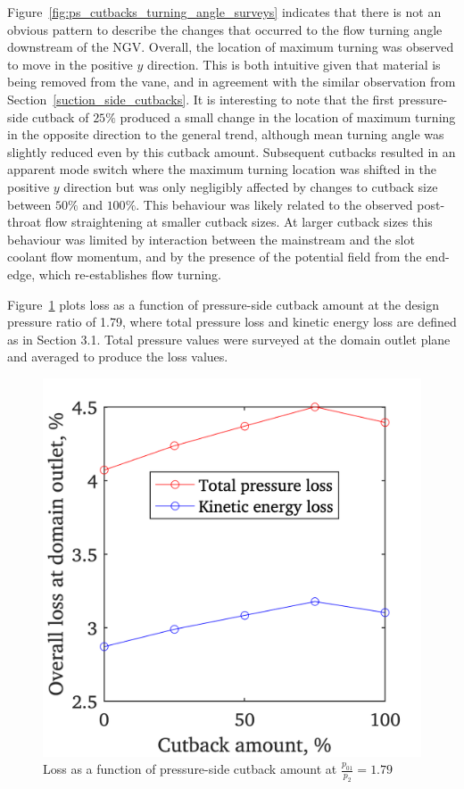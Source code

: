 \documentclass[a4paper, 11pt, oneside]{report}
\begin{document}
Figure~\ref{fig:ps_cutbacks_turning_angle_surveys} indicates that there is not an  obvious pattern to describe the changes that occurred to the flow turning angle downstream of the NGV. Overall, the location of maximum turning was observed to move in the positive $y$ direction. This is both intuitive given that material is being removed from the vane, and in agreement with the similar observation from Section~\ref{suction_side_cutbacks}. It is interesting to note that the first pressure-side cutback of $25\%$ produced a small change in the location of maximum turning in the opposite direction to the general trend, although mean turning angle was slightly reduced even by this cutback amount. Subsequent cutbacks resulted in an apparent mode switch where the maximum turning location was shifted in the positive $y$ direction but was only negligibly affected by changes to cutback size between $50\%$ and $100\%$. This behaviour was likely related to the observed post-throat flow straightening at smaller cutback sizes. At larger cutback sizes this behaviour was limited by interaction between the mainstream and the slot coolant flow momentum, and by the presence of the potential field from the end-edge, which re-establishes flow turning.

Figure~\ref{fig:ps_cutbacks_vs_losses} plots loss as a function of pressure-side cutback amount at the design pressure ratio of 1.79, where total pressure loss and kinetic energy loss are defined as in Section 3.1. Total pressure values were surveyed at the domain outlet plane and averaged to produce the loss values.

\begin{figure}[H]
	\centering
	\includegraphics[width=.45\textwidth]{figs/ps_cutbacks_vs_losses.png}
	\caption{Loss as a function of pressure-side cutback amount at $\frac{p_{01}}{p_2}=1.79$}
    \label{fig:ps_cutbacks_vs_losses}
\end{figure}
\end{document}
